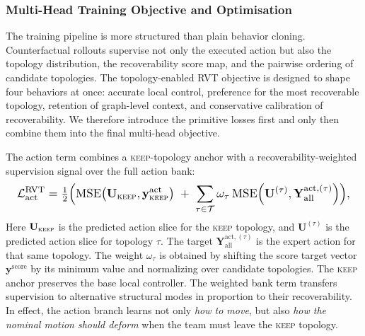 \documentclass{ieeeaccess}
\newcommand{\cT}{\mathcal{T}}
\begin{document}
\subsubsection{Multi-Head Training Objective and Optimisation}
The training pipeline is more structured than plain behavior cloning.
Counterfactual rollouts supervise not only the executed action but also
the topology distribution, the recoverability score map, and the
pairwise ordering of candidate topologies. The topology-enabled RVT
objective is designed to shape four behaviors at once: accurate local
control, preference for the most recoverable topology, retention of
graph-level context, and conservative calibration of recoverability. We
therefore introduce the primitive losses first and only then combine
them into the final multi-head objective.

The action term combines a \textsc{keep}-topology anchor with a recoverability-weighted supervision signal over the full action bank:
\begin{equation}
\resizebox{0.98\columnwidth}{!}{$\displaystyle
\mathcal{L}^{\mathrm{RVT}}_{\mathrm{act}}
= \tfrac{1}{2}\Bigl(
\mathrm{MSE}\!\left(\mathbf{U}_{\textsc{keep}},
\mathbf{y}^{\mathrm{act}}_{\textsc{keep}}\right)
\;+\;
\sum_{\tau\in\cT}\omega_\tau\,
\mathrm{MSE}\!\left(\mathbf{U}^{(\tau)},
\mathbf{Y}^{\mathrm{act},(\tau)}_{\mathrm{all}}\right)
\Bigr),
$}
\label{eq:loss_action}
\end{equation}
Here $\mathbf{U}_{\textsc{keep}}$ is the predicted action slice for the
\textsc{keep} topology, and $\mathbf{U}^{(\tau)}$ is the predicted
action slice for topology $\tau$. The target
$\mathbf{Y}^{\mathrm{act},(\tau)}_{\mathrm{all}}$ is the expert action
for that same topology. The weight $\omega_\tau$ is obtained by
shifting the score target vector $\mathbf{y}^{\mathrm{score}}$ by its
minimum value and normalizing over candidate topologies. The
\textsc{keep} anchor preserves the base local controller. The weighted
bank term transfers supervision to alternative structural modes in
proportion to their recoverability. In effect, the action branch learns
not only \emph{how to move}, but also \emph{how the nominal motion
should deform} when the team must leave the \textsc{keep} topology.
\end{document}
